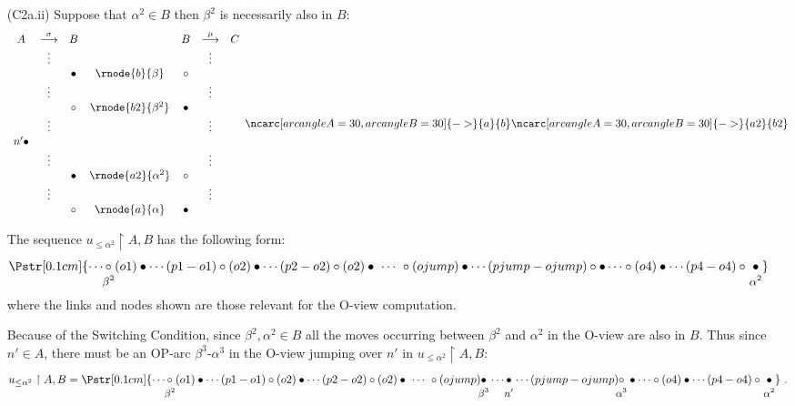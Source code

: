 \begin{itemize}
\begin{itemize}
\begin{itemize}
\begin{itemize}
\item[(C2a.ii)] Suppose that $\alpha^2 \in B$ then $\beta^2$ is necessarily also in $B$:
$$ 
\begin{array}{ccccccc}
A & \stackrel\sigma{\longrightarrow} & B & & B & \stackrel\mu{\longrightarrow} & C \\
& \vdots &&&&\vdots  \\
&&\omove & \rnode{b}{\beta} & \pmove \\
& \vdots &&&&\vdots  \\
&& \pmove & \rnode{b2}{\beta^2} & \omove  \\
& \vdots &&&&\vdots  \\
n' \omove && & &  \\
& \vdots &&&&\vdots  \\
&&\omove & \rnode{a2}{\alpha^2} & \pmove \\
& \vdots &&&&\vdots  \\
&&\pmove & \rnode{a}{\alpha} & \omove \\
\end{array}
\ncarc[arcangleA=30,arcangleB=30]{->}{a}{b}
\ncarc[arcangleA=30,arcangleB=30]{->}{a2}{b2}
 $$  


The sequence $u_{\leq \alpha^2} \upharpoonright A, B$
has the following form:
$$\Pstr[0.1cm]{\cdots \stk\pmove{\beta^2} (o1)\omove \cdots (p1-o1)\pmove 
(o2)\omove \cdots (p2-o2)\pmove (o2)\omove \ \cdots\ 
\pmove  (ojump) \omove \cdots
(pjump-ojump) \pmove \omove
\cdots
\pmove (o4)\omove \cdots (p4-o4)\pmove \ \stk\omove{\alpha^2}
}$$
where the links and nodes shown are those relevant for the O-view computation.


Because of the Switching Condition, since $\beta^2, \alpha^2 \in B$ all the moves occurring between $\beta^2$ and $\alpha^2$ in the O-view are also in $B$.
Thus since $n'\in A$, there must be an OP-arc $\beta^3$-$\alpha^3$ in the O-view jumping over $n'$ in $u_{\leq \alpha^2} \upharpoonright A,B$:
$$ 
u_{\leq \alpha^2} \upharpoonright {A, B}
=
\Pstr[0.1cm]{\cdots \stk\pmove{\beta^2} (o1)\omove \cdots (p1-o1)\pmove 
(o2)\omove \cdots (p2-o2)\pmove (o2)\omove \ \cdots\ 
\pmove  (ojump) {\stk\omove{\beta^3}} \cdots
\stk\omove{n'} \cdots
(pjump-ojump) {\stk\pmove{\alpha^3}} \omove
\cdots
\pmove (o4)\omove \cdots (p4-o4)\pmove \ \stk\omove{\alpha^2}
}\ .
$$



\end{itemize}
\end{itemize}
\end{itemize}
\end{itemize}
